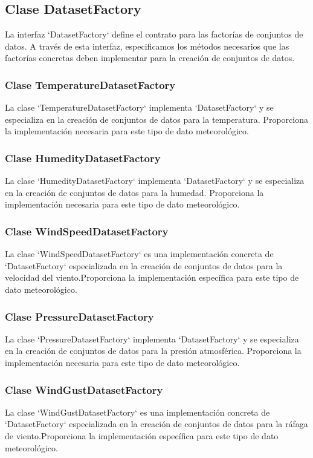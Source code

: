\documentclass{article}
\begin{document}
\subsection{Clase DatasetFactory}
La interfaz `DatasetFactory` define el contrato para las factorías de conjuntos de datos. A través de esta interfaz, especificamos los métodos necesarios que las factorías concretas deben implementar para la creación de conjuntos de datos.

\subsubsection{Clase TemperatureDatasetFactory}
La clase `TemperatureDatasetFactory` implementa `DatasetFactory` y se especializa en la creación de conjuntos de datos para la temperatura. Proporciona la implementación necesaria para este tipo de dato meteorológico.

\subsubsection{Clase HumedityDatasetFactory}
La clase `HumedityDatasetFactory` implementa `DatasetFactory` y se especializa en la creación de conjuntos de datos para la humedad.  Proporciona la implementación necesaria para este tipo de dato meteorológico.

\subsubsection{Clase WindSpeedDatasetFactory}
La clase `WindSpeedDatasetFactory` es una implementación concreta de `DatasetFactory` especializada en la creación de conjuntos de datos para la velocidad del viento.Proporciona la implementación específica para este tipo de dato meteorológico.

\subsubsection{Clase PressureDatasetFactory}
La clase `PressureDatasetFactory` implementa `DatasetFactory` y se especializa en la creación de conjuntos de datos para la presión atmosférica. Proporciona la implementación necesaria para este tipo de dato meteorológico.

\subsubsection{Clase WindGustDatasetFactory}
La clase `WindGustDatasetFactory` es una implementación concreta de `DatasetFactory` especializada en la creación de conjuntos de datos para la ráfaga de viento.Proporciona la implementación específica para este tipo de dato meteorológico.
\end{document}
